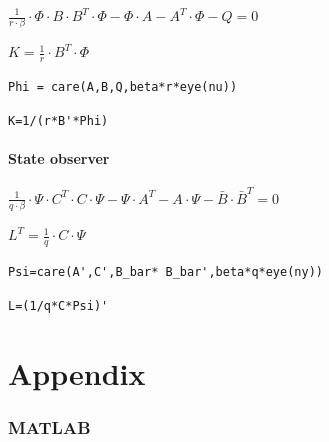 \documentclass[10pt,a4paper]{scrartcl}
\begin{document}
\begin{multicols*}{3}
	$\frac{1}{r\cdot\beta}\cdot\Phi\cdot B\cdot B^T\cdot\Phi-\Phi\cdot A-A^T\cdot\Phi-Q=0$
	
	$K=\frac{1}{r}\cdot B^T\cdot \Phi$
	
	\verb+Phi = care(A,B,Q,beta*r*eye(nu))+

	\verb+K=1/(r*B'*Phi)+
	
	\subsection*{State observer}
	
	$\frac{1}{q\cdot\beta}\cdot\Psi\cdot C^T\cdot C \cdot\Psi-\Psi\cdot A^T-A\cdot\Psi-\bar{B}\cdot\bar{B}^T=0 $
	
	$L^T=\frac{1}{q}\cdot C \cdot \Psi$
	
	\verb+Psi=care(A',C',B_bar* B_bar',beta*q*eye(ny))+
	
	\verb+L=(1/q*C*Psi)'+

	\part{Appendix}
	
	\section{MATLAB}
	

\end{multicols*}
\end{document}
